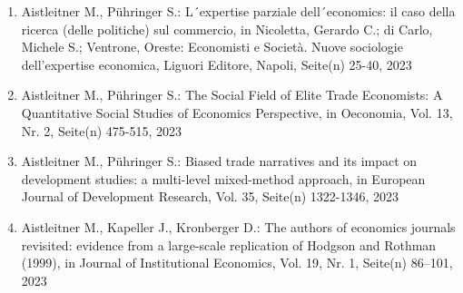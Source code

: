 \begin{enumerate}
	 \item Aistleitner M., Pühringer S.: L´expertise parziale dell´economics: il caso della ricerca (delle politiche) sul commercio, in Nicoletta, Gerardo C.; di Carlo, Michele S.; Ventrone, Oreste: Economisti e Società. Nuove sociologie dell'expertise economica, Liguori Editore, Napoli, Seite(n) 25-40, 2023
	 \item Aistleitner M., Pühringer S.: The Social Field of Elite Trade Economists: A Quantitative Social Studies of Economics Perspective, in Oeconomia, Vol. 13, Nr. 2, Seite(n) 475-515, 2023
	 \item Aistleitner M., Pühringer S.: Biased trade narratives and its impact on development studies: a multi-level mixed-method approach, in European Journal of Development Research, Vol. 35, Seite(n) 1322-1346, 2023
	 \item Aistleitner M., Kapeller J., Kronberger D.: The authors of economics journals revisited: evidence from a large-scale replication of Hodgson and Rothman (1999), in Journal of Institutional Economics, Vol. 19, Nr. 1, Seite(n) 86–101, 2023
\end{enumerate}
